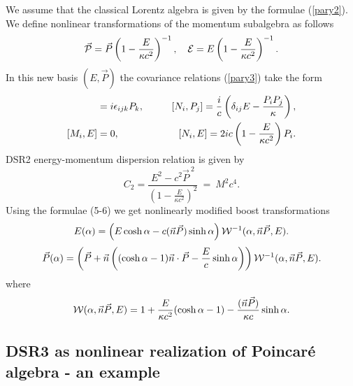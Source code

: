 \documentclass[a4paper,12pt]{article} \usepackage{times}
\begin{document}
We assume that the classical Lorentz algebra is given by the
formulae (\ref{pary2}). We define nonlinear transformations of the
momentum subalgebra as follows \begin{equation} \vec{\cal{P}}  = 
\vec{P}\left(1 - \frac{E}{\kappa c^2}\right)^{-1} ,\quad {\cal{E}} = 
E\left(1 - \frac{E}{\kappa c^2}\right)^{-1} . \end{equation} In this new
basis $(E, \vec{P})$ the covariance relations (\ref{pary3}) take the 
form
\begin{eqnarray} [M_i, P_j]& =  i\epsilon_{ijk} P_k , \qquad & 
[N_i,P_j] =
\frac{i}{c} \left(\delta_{ij} E - \frac{P_i P_j}{\kappa}\right) ,\cr
[M_i,E]& = 0 ,\quad & [N_i, E ] =  2i c \left(1 - \frac{E}{\kappa
c^2}\right) P_i . \end{eqnarray} DSR2 energy-momentum  
dispersion relation
is given by \begin{equation} C_2 = \frac{E^2 - c^2 \vec{P}^{\ 
2}}{\left(1
- \frac{E}{\kappa c^2}\right)^2} \ = \ M^2 c^4 . \end{equation} Using 
the
formulae (5-6) we get nonlinearly modified  boost transformations
\begin{equation} E(\alpha) = \left(E\cosh\alpha - c
(\vec{n}\vec{P})\sinh\alpha\right) {\cal{W}}^{-1}(\alpha, \vec{n}\vec{P},
E ) . \end{equation} \begin{equation} \vec{P}(\alpha)=  \left(\vec{P} +
\vec{n}\left((\cosh\alpha-1)\vec{n}\cdot\vec{P} -
\frac{E}{c}\sinh\alpha\right)\right) {\cal{W}}^{-1}(\alpha,
\vec{n}\vec{P}, E) .\end{equation} where \begin{equation}
{\cal{W}}(\alpha, \vec{n}\vec{P}, E)  =  1 + \frac{E}{\kappa c^2}
(\cosh\alpha - 1) - \frac{(\vec{n}\vec{P})}{\kappa c} \sinh\alpha
.\end{equation}


\subsection{DSR3 as nonlinear realization of Poincar\'{e}
algebra - an example}
\end{document}
